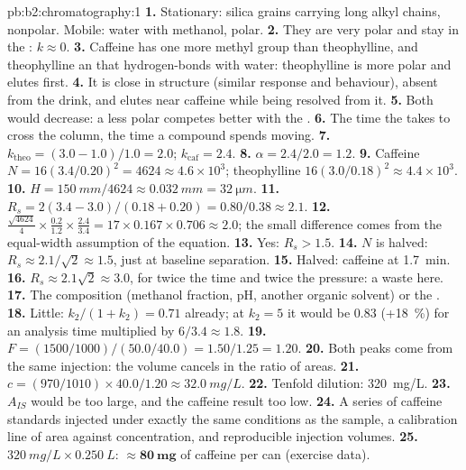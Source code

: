 \begin{solution}{pb:b2:chromatography:1}
\textbf{1.} Stationary: silica grains carrying long alkyl chains, nonpolar. Mobile: water with
methanol, polar.
\textbf{2.} They are very polar and stay in the : $k \approx 0$.
\textbf{3.} Caffeine has one more methyl group than theophylline, and theophylline an  that
hydrogen-bonds with water: theophylline is more polar and elutes first.
\textbf{4.} It is close in structure (similar response and behaviour), absent from the drink, and elutes
near caffeine while being resolved from it.
\textbf{5.} Both would decrease: a less polar  competes better with the .
\textbf{6.} The time the  takes to cross the column, the time a compound spends moving.
\textbf{7.} $k_{\mathrm{theo}} = (3.0 - 1.0)/1.0 = 2.0$; $k_{\mathrm{caf}} = 2.4$.
\textbf{8.} $\alpha = 2.4/2.0 = 1.2$.
\textbf{9.} Caffeine $N = 16(3.4/0.20)^2 = 4624 \approx 4.6 \times 10^3$; theophylline $16(3.0/0.18)^2
\approx 4.4 \times 10^3$.
\textbf{10.} $H = \qty{150}{mm}/4624 \approx \qty{0.032}{mm} = \qty{32}{\micro m}$.
\textbf{11.} $R_s = 2(3.4 - 3.0)/(0.18 + 0.20) = 0.80/0.38 \approx 2.1$.
\textbf{12.} $\frac{\sqrt{4624}}{4} \times \frac{0.2}{1.2} \times \frac{2.4}{3.4} = 17 \times 0.167 \times
0.706 \approx 2.0$; the small difference comes from the equal-width assumption of the equation.
\textbf{13.} Yes: $R_s > 1.5$.
\textbf{14.} $N$ is halved: $R_s \approx 2.1/\sqrt2 \approx 1.5$, just at baseline separation.
\textbf{15.} Halved: caffeine at \qty{1.7}{min}.
\textbf{16.} $R_s \approx 2.1\sqrt2 \approx 3.0$, for twice the time and twice the pressure: a waste here.
\textbf{17.} The  composition (methanol fraction, pH, another organic solvent) or the
.
\textbf{18.} Little: $k_2/(1 + k_2) = 0.71$ already; at $k_2 = 5$ it would be 0.83 (+18~\%) for an
analysis time multiplied by $6/3.4 \approx 1.8$.
\textbf{19.} $F = (1500/1000)/(50.0/40.0) = 1.50/1.25 = 1.20$.
\textbf{20.} Both peaks come from the same injection: the volume cancels in the ratio of areas.
\textbf{21.} $c = (970/1010) \times 40.0/1.20 \approx \qty{32.0}{mg/L}$.
\textbf{22.} Tenfold dilution: \qty{320}{mg/L}.
\textbf{23.} $A_{IS}$ would be too large, and the caffeine result too low.
\textbf{24.} A series of caffeine standards injected under exactly the same conditions as the sample, a
calibration line of area against concentration, and reproducible injection volumes.
\textbf{25.} $\qty{320}{mg/L} \times \qty{0.250}{L}$: $\boldsymbol{\approx \qty{80}{mg}}$ of caffeine per can (exercise
data).
\end{solution}
